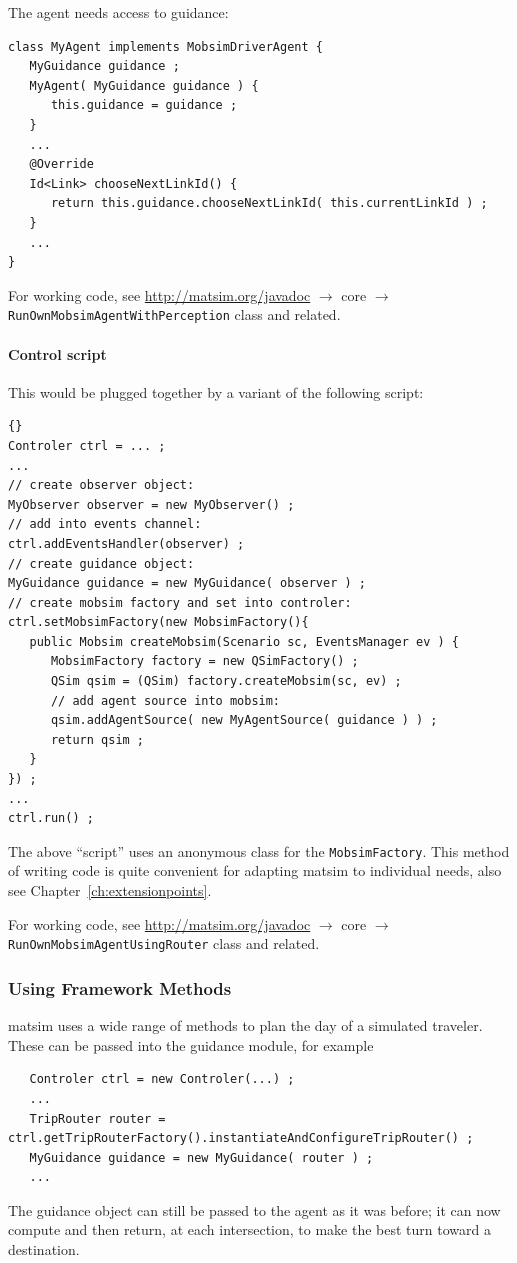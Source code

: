 The agent needs access to guidance:
\begin{lstlisting}
class MyAgent implements MobsimDriverAgent {
   MyGuidance guidance ;
   MyAgent( MyGuidance guidance ) {
      this.guidance = guidance ;
   }  
   ...
   @Override
   Id<Link> chooseNextLinkId() {
      return this.guidance.chooseNextLinkId( this.currentLinkId ) ;
   }
   ...
}
\end{lstlisting}
For working code, see \url{http://matsim.org/javadoc} $\to$ core $\to$ \lstinline{RunOwnMobsimAgentWithPerception} class and related.

\paragraph{Control script}

This would be plugged together by a variant of the following script:
\begin{lstlisting}[basicstyle=\footnotesize\tt]{}
Controler ctrl = ... ;
...
// create observer object:
MyObserver observer = new MyObserver() ;
// add into events channel:
ctrl.addEventsHandler(observer) ;
// create guidance object:
MyGuidance guidance = new MyGuidance( observer ) ;
// create mobsim factory and set into controler:
ctrl.setMobsimFactory(new MobsimFactory(){
   public Mobsim createMobsim(Scenario sc, EventsManager ev ) {
      MobsimFactory factory = new QSimFactory() ; 
      QSim qsim = (QSim) factory.createMobsim(sc, ev) ;
      // add agent source into mobsim:
      qsim.addAgentSource( new MyAgentSource( guidance ) ) ;
      return qsim ;
   }
}) ;
...
ctrl.run() ;
\end{lstlisting}
The above ``script'' uses an anonymous class for the \lstinline$MobsimFactory$. This method of writing code is quite convenient for adapting \gls{matsim} to individual needs, also see Chapter~\ref{ch:extensionpoints}.

For working code, see \url{http://matsim.org/javadoc} $\to$ core $\to$ \lstinline{RunOwnMobsimAgentUsingRouter} class and related.

\subsubsection{Using Framework Methods}
\gls{matsim} uses a wide range of methods to plan the day of a simulated traveler. These can be passed into the guidance module, for example
\begin{lstlisting}
   Controler ctrl = new Controler(...) ;
   ...
   TripRouter router = ctrl.getTripRouterFactory().instantiateAndConfigureTripRouter() ;
   MyGuidance guidance = new MyGuidance( router ) ;
   ...
\end{lstlisting}
The guidance object can still be passed to the agent as it was before; it can now compute and then return, at each intersection, to make the best turn toward a destination.

